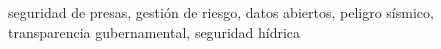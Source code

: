 \documentclass[journal]{IEEEtran}
\begin{document}
\begin{IEEEkeywords}
seguridad de presas, gesti\'on de riesgo, datos abiertos, peligro s\'ismico, transparencia gubernamental, seguridad h\'idrica
\end{IEEEkeywords}










\end{document}
